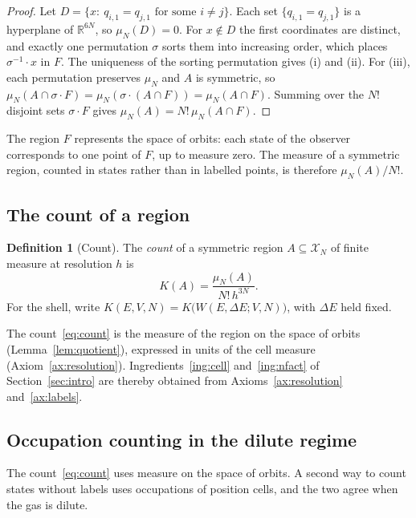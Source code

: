 \documentclass[11pt,a4paper]{article}
\theoremstyle{definition}
\newtheorem{definition}[theorem]{Definition}
\theoremstyle{remark}
\newcommand{\R}{\mathbb{R}}
\newcommand{\X}{\mathcal{X}}
\begin{document}
\begin{proof}
Let $D=\{x:\ q_{i,1}=q_{j,1}\text{ for some }i\ne j\}$.
Each set $\{q_{i,1}=q_{j,1}\}$ is a hyperplane of $\R^{6N}$, so $\mu_N(D)=0$.
For $x\notin D$ the first coordinates are distinct, and exactly one permutation $\sigma$ sorts them into increasing order, which places $\sigma^{-1}\cdot x$ in $F$.
The uniqueness of the sorting permutation gives (i) and (ii).
For (iii), each permutation preserves $\mu_N$ and $A$ is symmetric, so $\mu_N(A\cap\sigma\cdot F)=\mu_N(\sigma\cdot(A\cap F))=\mu_N(A\cap F)$.
Summing over the $N!$ disjoint sets $\sigma\cdot F$ gives $\mu_N(A)=N!\,\mu_N(A\cap F)$.
\end{proof}

The region $F$ represents the space of orbits: each state of the observer corresponds to one point of $F$, up to measure zero.
The measure of a symmetric region, counted in states rather than in labelled points, is therefore $\mu_N(A)/N!$.

\subsection{The count of a region}

\begin{definition}[Count]
\label{def:count}
The \emph{count} of a symmetric region $A\subseteq\X_N$ of finite measure at resolution $h$ is
\begin{equation}
K(A)=\frac{\mu_N(A)}{N!\,h^{3N}}.
\label{eq:count}
\end{equation}
For the shell, write $K(E,V,N)=K\bigl(W(E,\Delta E;V,N)\bigr)$, with $\Delta E$ held fixed.
\end{definition}

The count~\eqref{eq:count} is the measure of the region on the space of orbits (Lemma~\ref{lem:quotient}), expressed in units of the cell measure (Axiom~\ref{ax:resolution}).
Ingredients~\ref{ing:cell} and~\ref{ing:nfact} of Section~\ref{sec:intro} are thereby obtained from Axioms~\ref{ax:resolution} and~\ref{ax:labels}.

\subsection{Occupation counting in the dilute regime}

The count~\eqref{eq:count} uses measure on the space of orbits.
A second way to count states without labels uses occupations of position cells, and the two agree when the gas is dilute.
\end{document}
